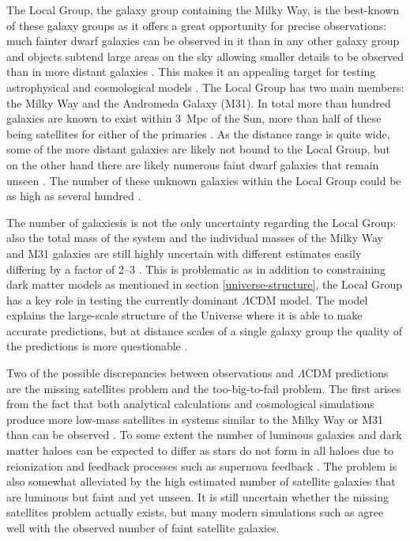 \documentclass[english, oneside]{HYgradu}
\begin{document}
The Local Group, the galaxy group containing the Milky Way, is the best-known of these galaxy groups as it offers a great opportunity for precise observations: much fainter dwarf galaxies can be observed in it than in any other galaxy group and objects subtend large areas on the sky allowing smaller details to be observed than in more distant galaxies \citep{mo2010galaxy, mcconnachie2012observed}. This makes it an appealing target for testing astrophysical and cosmological models \citep{bullock2017small}. The Local Group has two main members: the Milky Way and the Andromeda Galaxy (M31). In total more than hundred galaxies are known to exist within 3~Mpc of the Sun, more than half of these being satellites for either of the primaries \citep{mcconnachie2012observed}. As the distance range is quite wide, some of the more distant galaxies are likely not bound to the Local Group, but on the other hand there are likely numerous faint dwarf galaxies that remain unseen \citep{mcconnachie2012observed}. The number of these unknown galaxies within the Local Group could be as high as several hundred \citep{tollerud2008hundreds}.

The number of galaxiesis is not the only uncertainty regarding the Local Group: also the total mass of the system and the individual masses of the Milky Way and M31 galaxies are still highly uncertain with different estimates easily differing by a factor of 2--3 \citep{wang2015estimating, carlesi2016constraining}. This is problematic as in addition to constraining dark matter models as mentioned in section \ref{universe-structure}, the Local Group has a key role in testing the currently dominant $\Lambda$CDM model. The model explains the large-scale structure of the Universe where it is able to make accurate predictions, but at distance scales of a single galaxy group the quality of the predictions is more questionable \citep{bullock2017small}.

Two of the possible discrepancies between observations and $\Lambda$CDM predictions are the missing satellites problem and the too-big-to-fail problem. The first arises from the fact that both analytical calculations and cosmological simulations produce more low-mass satellites in systems similar to the Milky Way or M31 than can be observed \citep{klypin1999missing}. To some extent the number of luminous galaxies and dark matter haloes can be expected to differ as stars do not form in all haloes due to reionization and feedback processes such as supernova feedback \citep{efstathiou1992suppressing, larson1974effects}. The problem is also somewhat alleviated by the high estimated number of satellite galaxies that are luminous but faint and yet unseen. It is still uncertain whether the missing satellites problem actually exists, but many modern simulations such as\citep{sawala2016apostle} agree well with the observed number of faint satellite galaxies.
\end{document}
